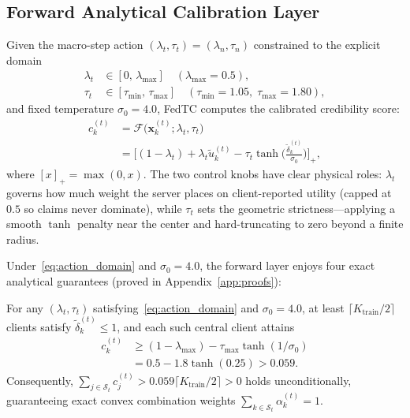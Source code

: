 \subsection{Forward Analytical Calibration Layer}
\label{sec:trust_calibration}

Given the macro-step action $(\lambda_t, \tau_t) = (\lambda_n, \tau_n)$ constrained to the explicit domain
\begin{equation}
\begin{aligned}
    \lambda_t &\in [0,\, \lambda_{\max}] \quad (\lambda_{\max} = 0.5), \\
    \tau_t &\in [\tau_{\min},\, \tau_{\max}] \quad (\tau_{\min} = 1.05,\; \tau_{\max} = 1.80),
\end{aligned}
    \label{eq:action_domain}
\end{equation}
and fixed temperature $\sigma_0 = 4.0$, FedTC computes the calibrated credibility score:
\begin{equation}
\begin{aligned}
    c_k^{(t)} &= \mathcal{F}\big(\mathbf{x}_k^{(t)}; \lambda_t, \tau_t\big) \\
    &= \Big[(1 - \lambda_t) + \lambda_t \tilde{u}_k^{(t)} - \tau_t \tanh\!\Big(\frac{\tilde{\delta}_k^{(t)}}{\sigma_0}\Big)\Big]_+,
\end{aligned}
    \label{eq:calibration}
\end{equation}
where $[x]_+ = \max(0, x)$. The two control knobs have clear physical roles: $\lambda_t$ governs how much weight the server places on client-reported utility (capped at $0.5$ so claims never dominate), while $\tau_t$ sets the geometric strictness---applying a smooth $\tanh$ penalty near the center and hard-truncating to zero beyond a finite radius.

Under~\eqref{eq:action_domain} and $\sigma_0 = 4.0$, the forward layer enjoys four exact analytical guarantees (proved in Appendix~\ref{app:proofs}):

\begin{proposition}
\label{prop:non_collapse}
For any $(\lambda_t, \tau_t)$ satisfying~\eqref{eq:action_domain} and $\sigma_0 = 4.0$, at least $\lceil K_{\mathrm{train}} / 2 \rceil$ clients satisfy $\tilde{\delta}_k^{(t)} \le 1$, and each such central client attains
\begin{equation}
\begin{aligned}
    c_k^{(t)} &\ge (1 - \lambda_{\max}) - \tau_{\max} \tanh(1 / \sigma_0) \\
    &= 0.5 - 1.8\tanh(0.25) > 0.059.
\end{aligned}
    \label{eq:non_collapse}
\end{equation}
Consequently, $\sum_{j\in\mathcal{S}_t} c_j^{(t)} > 0.059 \lceil K_{\mathrm{train}} / 2 \rceil > 0$ holds unconditionally, guaranteeing exact convex combination weights $\sum_{k\in\mathcal{S}_t} \alpha_k^{(t)} = 1$.
\end{proposition}

